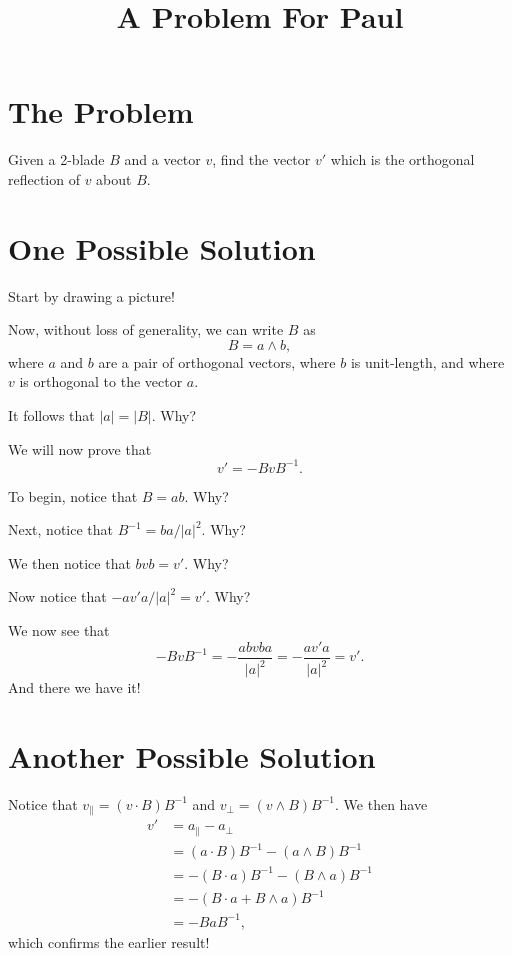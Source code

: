 \documentclass{article}
\title{A Problem For Paul}
\begin{document}
\maketitle

\section*{The Problem}

Given a 2-blade $B$ and a vector $v$, find the vector $v'$ which is the orthogonal
reflection of $v$ about $B$.

\section*{One Possible Solution}

Start by drawing a picture!

Now, without loss of generality, we can write $B$ as
\begin{equation*}
B = a\wedge b,
\end{equation*}
where $a$ and $b$ are a pair of orthogonal vectors, where $b$ is unit-length, and where $v$ is orthogonal to the vector $a$.

It follows that $|a|=|B|$.  Why?

We will now prove that
\begin{equation*}
v' = -BvB^{-1}.
\end{equation*}

To begin, notice that $B = ab$.  Why?

Next, notice that $B^{-1}=ba/|a|^2$.  Why?

We then notice that $bvb = v'$.  Why?

Now notice that $-av'a/|a|^2=v'$.  Why?

We now see that
\begin{equation*}
-BvB^{-1} = -\frac{abvba}{|a|^2} = -\frac{av'a}{|a|^2} = v'.
\end{equation*}
And there we have it!

\section*{Another Possible Solution}

Notice that $v_{\parallel}=(v\cdot B)B^{-1}$ and $v_{\perp}=(v\wedge B)B^{-1}$.  We then have
\begin{align*}
v' &= a_{\parallel} - a_{\perp} \\
 &= (a\cdot B)B^{-1} - (a\wedge B)B^{-1} \\
 &= -(B\cdot a)B^{-1} - (B\wedge a)B^{-1} \\
 &= -(B\cdot a + B\wedge a)B^{-1} \\
 &= -BaB^{-1},
\end{align*}
which confirms the earlier result!
\end{document}
